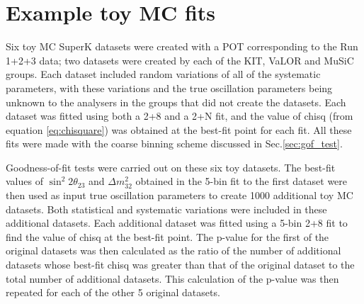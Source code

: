 \clearpage

\section{Example toy MC fits}
\label{appendix:example_toy_mc_fits}

Six toy MC SuperK datasets were created with a POT corresponding to the Run 1+2+3 data; two
datasets were created by each of the KIT, VaLOR and MuSiC groups. Each dataset included random variations of all
of the systematic parameters, with these variations and the true oscillation parameters being unknown to the analysers
in the groups that did not create the datasets. Each dataset was fitted using both a 2+8 and a 2+N fit, and the value 
of chisq (from equation \ref{eq:chisquare}) was obtained at the best-fit point for each fit. All these fits were made 
with the coarse binning scheme discussed in Sec.\ref{sec:gof_test}.

Goodness-of-fit tests were carried out on these six toy datasets. 
The best-fit values of $\sin^{2}2\theta_{23}$ and $\Delta m^{2}_{32}$ obtained in the 5-bin fit to the first dataset
were then used as input true oscillation parameters to create 1000 additional toy MC datasets. Both statistical and
systematic variations were included in these additional datasets. Each additional dataset was fitted using a 5-bin
2+8 fit to find the value of chisq at the best-fit point. The p-value for the first of the original datasets was
then calculated as the ratio of the number of additional datasets whose best-fit chisq was greater than that of the
original dataset to the total number of additional datasets. This calculation of the p-value was then repeated for 
each of the other 5 original datasets. 

